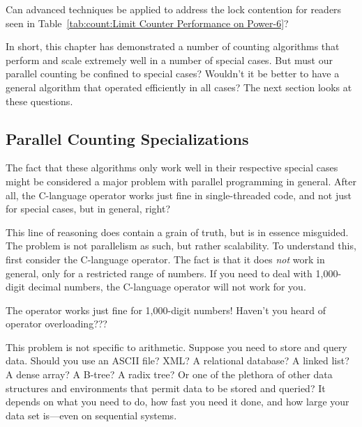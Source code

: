 \QuickQuiz{}
	Can advanced techniques be applied to address the lock
	contention for readers seen in
	Table~\ref{tab:count:Limit Counter Performance on Power-6}?
 \QuickQuizEnd

In short, this chapter has demonstrated a number of counting algorithms
that perform and scale extremely well in a number of special cases.
But must our parallel counting be confined to special cases?
Wouldn't it be better to have a general algorithm that operated
efficiently in all cases?
The next section looks at these questions.

\subsection{Parallel Counting Specializations}
\label{sec:count:Parallel Counting Specializations}

The fact that these algorithms only work well in their respective special
cases might be considered a major problem with parallel programming in
general.
After all, the C-language \co{++} operator works just fine in single-threaded
code, and not just for special cases, but in general, right?

This line of reasoning does contain a grain of truth, but is in essence
misguided.
The problem is not parallelism as such, but rather scalability.
To understand this, first consider the C-language \co{++} operator.
The fact is that it does \emph{not} work in general, only for a restricted
range of numbers.
If you need to deal with 1,000-digit decimal numbers, the C-language \co{++}
operator will not work for you.

\QuickQuiz{}
	The \co{++} operator works just fine for 1,000-digit numbers!
	Haven't you heard of operator overloading???
 \QuickQuizEnd

This problem is not specific to arithmetic.
Suppose you need to store and query data.
Should you use an ASCII file? 
XML?
A relational database?
A linked list?
A dense array?
A B-tree?
A radix tree?
Or one of the plethora of other data
structures and environments that permit data to be stored and queried?
It depends on what you need to do, how fast you need it done, and how
large your data set is---even on sequential systems.

